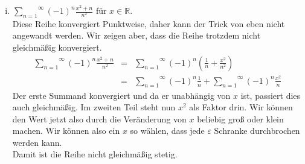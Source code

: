 \documentclass[11pt,a4paper,ngerman]{article}
\begin{document}
\begin{enumerate}[(i)]
    \item $\overset{\infty}{\underset{n=1}{\sum}} (-1)^n \frac{x^2+n}{n^2}$ für $x\in\mathbb{R}$.\\
        Diese Reihe konvergiert Punktweise, daher kann der Trick von eben nicht angewandt werden.
        Wir zeigen aber, dass die Reihe trotzdem nicht gleichmäßig konvergiert.\\
        $$\begin{array}{rcl}
            \overset{\infty}{\underset{n=1}{\sum}} (-1)^n \frac{x^2 + n}{n^2}
                &=& \overset{\infty}{\underset{n=1}{\sum}} (-1)^n \left( \frac{1}{n} + \frac{x^2}{n^2} \right)\\
                &=& \overset{\infty}{\underset{n=1}{\sum}} (-1)^n \frac{1}{n} +
                    \overset{\infty}{\underset{n=1}{\sum}} (-1)^n \frac{x^2}{n}
        \end{array}$$
        Der erste Summand konvergiert und da er unabhängig von $x$ ist, passiert dies auch
        gleichmäßig. Im zweiten Teil steht nun $x^2$ als Faktor drin. Wir können den
        Wert jetzt also durch die Veränderung von $x$ beliebig groß oder klein machen.
        Wir können also ein $x$ so wählen, dass jede $\varepsilon$ Schranke durchbrochen werden
        kann.\\
        Damit ist die Reihe nicht gleichmäßig stetig.
\end{enumerate}

\label{LastPage}
\end{document}

